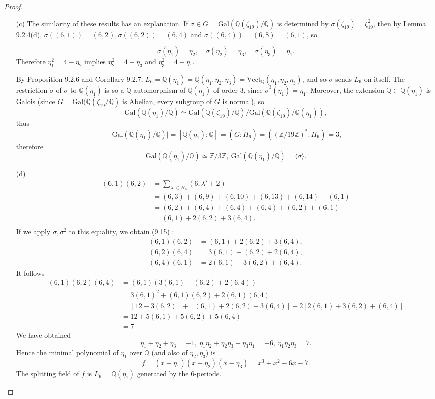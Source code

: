 \documentclass[11pt,a4paper]{article}
\newcommand{\Q}{\mathbb{Q}}
\newcommand{\Z}{\mathbb{Z}}
\newcommand{\Gal}{\mathrm{Gal}}
\begin{document}
\begin{proof}
\begin{enumerate}
\item[(c)]
The similarity of these results has an explanation. If $\sigma \in G=\Gal(\Q(\zeta_{19})/\Q)$ is determined by $\sigma(\zeta_{19}) = \zeta_{19}^2$, then by Lemma 9.2.4(d), 
$\sigma((6,1)) = (6,2), \sigma((6,2)) = (6,4)$ and $\sigma((6,4)) = (6,8) = (6,1)$, so

$$\sigma(\eta_1) = \eta_2,\quad  \sigma(\eta_2) = \eta_3,\quad  \sigma(\eta_3) = \eta_1.$$
Therefore $\eta_1^2 = 4 - \eta_2$ implies $\eta_2^2 = 4 - \eta_3$ and $\eta_3^2 = 4 - \eta_1$.

By Proposition 9.2.6 and Corollary 9.2.7, $L_6=\Q(\eta_1) =\Q(\eta_1,\eta_2,\eta_3)=\mathrm{Vect}_{\Q}(\eta_1,\eta_2,\eta_3)$, and so $\sigma$ sends $L_6$ on itself. The restriction $\tilde{\sigma}$ of $\sigma$ to $\Q(\eta_1)$ is so a $\Q$-automorphism of $\Q(\eta_1)$ of order 3, since $\tilde{\sigma}^3(\eta_1) = \eta_1$. Moreover, the extension $\Q \subset \Q(\eta_1)$ is Galois (since $G = \Gal(\Q(\zeta_{19}/\Q)$ is Abelian, every subgroup of $G$ is normal), so
$$\Gal(\Q(\eta_1)/\Q) \simeq \Gal(\Q(\zeta_{19})/\Q) / \Gal(\Q(\zeta_{19})/\Q(\eta_1)),$$
thus $$\vert \Gal(\Q(\eta_1)/\Q) \vert = [\Q(\eta_1):\Q] =(G :\tilde{H}_6) = ((\Z/19\Z)^*:H_6) = 3,$$ therefore
$$\Gal(\Q(\eta_1)/\Q) \simeq \Z/3\Z, \ \Gal(\Q(\eta_1)/\Q) = \langle \tilde{\sigma} \rangle.$$


\item[(d)]
\begin{align*}
(6,1)(6,2)&=\sum_{\lambda'\in H_6} (6,\lambda'+2)\\
&=(6,3)+(6,9)+(6,10)+(6,13)+(6,14)+(6,1)\\
&=(6,2)+(6,4)+(6,4)+(6,4)+(6,2)+(6,1)\\
&=(6,1)+2(6,2)+3(6,4).\\
\end{align*}
If we apply  ${\sigma},{\sigma}^2$ to this equality, we obtain (9.15) :
\begin{align*}
(6,1)(6,2) &=(6,1)+2(6,2)+3(6,4),\\
(6,2)(6,4) &= 3(6,1)+(6,2)+2(6,4),\\
(6,4)(6,1) &=2(6,1)+3(6,2)+(6,4).
\end{align*}
It follows
\begin{align*}
(6,1)(6,2)(6,4)&=(6,1)(3(6,1)+(6,2)+2(6,4))\\
&=3(6,1)^2 +(6,1)(6,2)+2(6,1)(6,4)\\
&=[12 - 3(6,2)] + [(6,1)+2(6,2)+3(6,4)] + 2[2(6,1)+3(6,2)+(6,4)]\\
&=12 +5(6,1) +5(6,2)+5(6,4)\\
&=7
\end{align*}
We have obtained
$$\eta_1+ \eta_2+\eta_3 = -1,\ \eta_1\eta_2+\eta_2\eta_3+\eta_3\eta_1 = -6,\  \eta_1 \eta_2 \eta_3 = 7.$$
Hence the minimal polynomial of $\eta_1$ over $\Q$ (and also of  $\eta_2,\eta_3$) is
$$f=(x-\eta_1)(x-\eta_2)(x-\eta_3) = x^3+x^2-6x-7.$$
The splitting field of $f$ is  $L_6=\Q(\eta_1)$ generated by the 6-periods.



\end{enumerate}
\end{proof}
\end{document}
